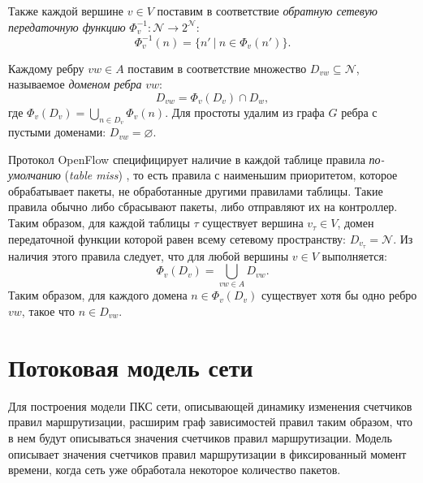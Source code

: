 \documentclass[../thesis.tex]{subfiles}
\begin{document}
Также каждой вершине $v\in V$ поставим в соответствие \textit{обратную сетевую передаточную функцию} $\Phi^{-1}_v:\mathcal{N} \rightarrow 2^{\mathcal{N}}$:
\begin{equation} \label{eq:inverse_network_transfer}
    \Phi^{-1}_v(n)
    =
    \big\{ n'\ |\ n\in \Phi_v(n') \big\}.
\end{equation}

Каждому ребру $vw\in A$ поставим в соответствие множество $D_{vw}\subseteq \mathcal{N}$, называемое \textit{доменом ребра} $vw$:
\begin{equation} \label{eq:arc_domain}
    D_{vw} = \Phi_v(D_v) \cap D_w,
\end{equation}
где $\Phi_v(D_v) = \bigcup_{n\in D_v} {\Phi_v(n)}$.
Для простоты удалим из графа $G$ ребра с пустыми доменами: $D_{vw} = \varnothing$.

Протокол OpenFlow специфицирует наличие в каждой таблице правила \textit{по-умолчанию} (\textit{table miss}) \cite{openflow15}, то есть правила с наименьшим приоритетом, которое обрабатывает пакеты, не обработанные другими правилами таблицы.
Такие правила обычно либо сбрасывают пакеты, либо отправляют их на контроллер.
Таким образом, для каждой таблицы $\tau$ существует вершина $v_\tau\in V$, домен передаточной функции которой равен всему сетевому пространству: $D_{v_{\tau}}=\mathcal{N}$.
Из наличия этого правила следует, что для любой вершины $v\in V$ выполняется:
\begin{equation} \label{eq:default_rule}
    \Phi_v(D_v) = \bigcup_{vw\in A} {D_{vw}}.
\end{equation}
Таким образом, для каждого домена $n\in \Phi_v(D_v)$ существует хотя бы одно ребро $vw$, такое что $n\in D_{vw}$.

\pagebreak

\section{Потоковая модель сети} \label{section:network_flow_model}

Для построения модели ПКС сети, описывающей динамику изменения счетчиков правил маршрутизации, расширим граф зависимостей правил таким образом, что в нем будут описываться значения счетчиков правил маршрутизации.
Модель описывает значения счетчиков правил маршрутизации в фиксированный момент времени, когда сеть уже обработала некоторое количество пакетов.
\end{document}
